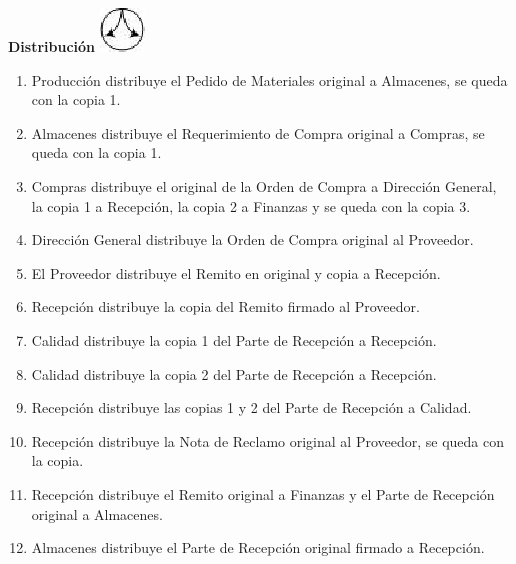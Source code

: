 \begin{center}
  \textbf{Distribución}
  \includegraphics{./Images/Simbolos/simbolo-Distribucion.png}
\end{center}
\begin{enumerate}
  \item Producción distribuye el Pedido de Materiales original a Almacenes, se queda con la copia 1.
  \item Almacenes distribuye el Requerimiento de Compra original a Compras, se queda con la copia 1.
  \item Compras distribuye el original de la Orden de Compra a Dirección General, la copia 1 a Recepción, la copia 2 a Finanzas y se queda con la copia 3.
  \item Dirección General distribuye la Orden de Compra original al Proveedor.
  \item El Proveedor distribuye el Remito en original y copia a Recepción.
  \item Recepción distribuye la copia del Remito firmado al Proveedor.
  \item Calidad distribuye la copia 1 del Parte de Recepción a Recepción.
  \item Calidad distribuye la copia 2 del Parte de Recepción a Recepción.
  \item Recepción distribuye las copias 1 y 2 del Parte de Recepción a Calidad.
  \item Recepción distribuye la Nota de Reclamo original al Proveedor, se queda con la copia.
  \item Recepción distribuye el Remito original a Finanzas y el Parte de Recepción original a Almacenes.
  \item Almacenes distribuye el Parte de Recepción original firmado a Recepción.
\end{enumerate}

